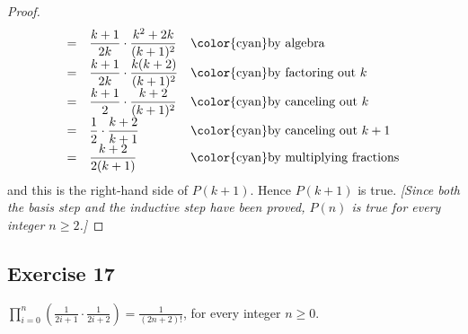\documentclass[14pt]{extarticle}
\newcommand{\dps}{\displaystyle}
\newcommand{\cy}{\color{cyan}}
\begin{document}
\begin{proof}
\[\begin{array}{lll}
            = & \dps \frac{k+1}{2k} \cdot \frac{k^2+2k}{(k+1)^2}       & \text{\cy by algebra}               \\
            = & \dps \frac{k+1}{2k} \cdot \frac{k(k+2)}{(k+1)^2}       & \text{\cy by factoring out $k$}     \\
            = & \dps \frac{k+1}{2} \cdot \frac{k+2}{(k+1)^2}           & \text{\cy by canceling out $k$}     \\
            = & \dps \frac{1}{2} \cdot \frac{k+2}{k+1}                 & \text{\cy by canceling out $k+1$}   \\
            = & \dps \frac{k+2}{2(k+1)}                                & \text{\cy by multiplying fractions}
        \end{array}
    \]
    and this is the right-hand side of $P(k + 1)$. Hence $P(k + 1)$ is true. {\it [Since both the basis step and the inductive step have been proved, $P(n)$ is true for every integer $n \geq 2$.]}
\end{proof}

\subsection{Exercise 17}
$\dps \prod_{i=0}^{n}\left(\frac{1}{2i+1} \cdot \frac{1}{2i+2}\right) = \frac{1}{(2n+2)!}$, for every integer $n \geq 0$.
\end{document}
